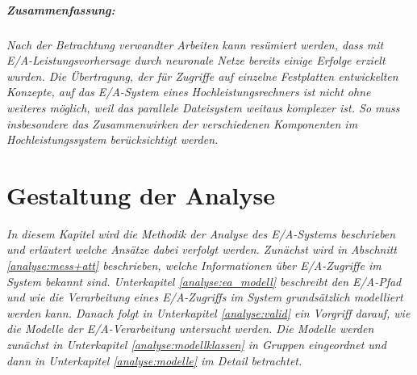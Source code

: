 \documentclass[
	12pt,
	a4paper,
	BCOR10mm,
	DIV14,
	listof=totoc,
	bibliography=totoc,
	headsepline
]{scrreprt}
\begin{document}
\paragraph{Zusammenfassung:}
\textit{
	Nach der Betrachtung verwandter Arbeiten kann resümiert werden, dass mit E/A-Leistungsvorhersage durch neuronale Netze bereits einige Erfolge erzielt wurden. Die Übertragung, der für Zugriffe auf einzelne Festplatten entwickelten Konzepte, auf das E/A-System eines Hochleistungsrechners ist nicht ohne weiteres möglich, weil das parallele Dateisystem weitaus komplexer ist. So muss insbesondere das Zusammenwirken der verschiedenen Komponenten im Hochleistungssystem berücksichtigt werden.
}

\chapter{Gestaltung der Analyse}
\label{gestaltung_der_analyse}
\textit{	
In diesem Kapitel wird die Methodik der Analyse des E/A-Systems beschrieben und erläutert welche Ansätze dabei verfolgt werden.
Zunächst wird in Abschnitt \ref{analyse:mess+att} beschrieben, welche Informationen über E/A-Zugriffe im System bekannt sind. Unterkapitel \ref{analyse:ea_modell} beschreibt den E/A-Pfad und wie die Verarbeitung eines E/A-Zugriffs im  System grundsätzlich modelliert werden kann.
Danach folgt in Unterkapitel \ref{analyse:valid} ein Vorgriff darauf, wie die Modelle der E/A-Verarbeitung untersucht werden. Die Modelle werden zunächst in Unterkapitel \ref{analyse:modellklassen} in Gruppen eingeordnet und dann in Unterkapitel \ref{analyse:modelle} im Detail betrachtet.
}
\bigskip
\end{document}
